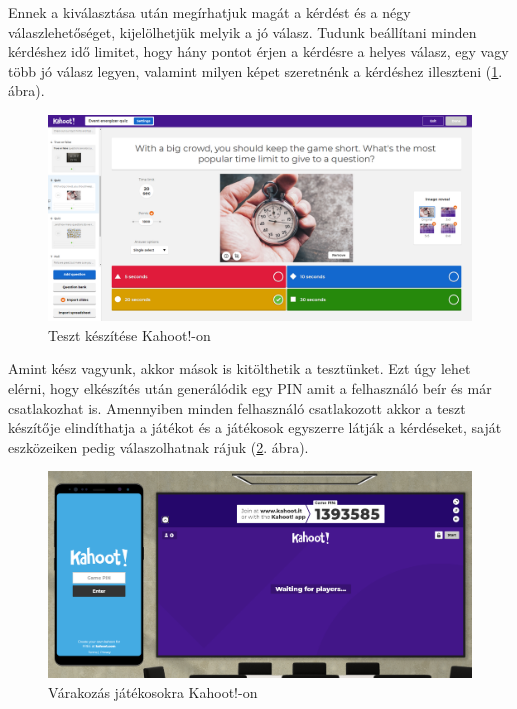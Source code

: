 Ennek a kiválasztása után megírhatjuk magát a kérdést és a négy válaszlehetőséget, kijelölhetjük melyik a jó válasz. Tudunk beállítani minden kérdéshez idő limitet, hogy hány pontot érjen a kérdésre a helyes válasz, egy vagy több jó válasz legyen, valamint milyen képet szeretnénk a kérdéshez illeszteni (\ref{fig:kahoot_1}. ábra).

\begin{figure}[h!]
	\centering
	\includegraphics[width=\linewidth]{images/kahoot_test_making.PNG}
	\caption{Teszt készítése Kahoot!-on}
	\label{fig:kahoot_1}
\end{figure}

Amint kész vagyunk, akkor mások is kitölthetik a tesztünket. Ezt úgy lehet elérni, hogy elkészítés után generálódik egy PIN amit a felhasználó beír és már csatlakozhat is. Amennyiben minden felhasználó csatlakozott akkor a teszt készítője elindíthatja a játékot és a játékosok egyszerre látják a kérdéseket, saját eszközeiken pedig válaszolhatnak rájuk (\ref{fig:kahoot_2}. ábra).

\begin{figure}[H]
	\centering
	\includegraphics[width=\textwidth]{images/kahoot_play.png}
	\caption{Várakozás játékosokra Kahoot!-on}
	\label{fig:kahoot_2}
\end{figure}

